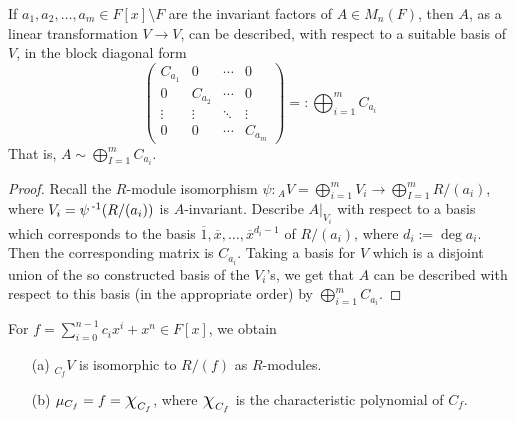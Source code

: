 \documentclass[11pt]{book}
\theoremstyle{definition}   \newtheorem{defn}[counter]{Definition} %
\newcommand{\ov}{\overline}   \newcommand{\wt}{\widetilde}
\newcommand{\bs}{\setminus}   \newcommand{\A}{\mathcal{A}}   \newcommand{\sy}{\textnormal{Syl}}   \newcommand{\size}[1]{\left| #1 \right|}
\newcommand{\mymatrix}[2]{\left( \begin{array}{#1} #2 \end{array} \right)}
\newcommand{\Chi}{\mbox{\Large $\chi$}}
\DeclareMathOperator{\ra}{\rightarrow}   \DeclareMathOperator{\Poly}{\mathbf{P}}   \DeclareMathOperator{\spn}{\textnormal{span}}   \DeclareMathOperator{\aut}{\textnormal{Aut}}
\newcommand{\vs}{\vspace{8pt}}
\numberwithin{counter}{chapter}
\begin{document}
\begin{corollary}
If $a_1,a_2,\dots,a_m \in F[x]\bs F$ are the invariant factors of $A \in M_n(F)$, then $A$, as a linear transformation $V \ra V$, can be described, with respect to a suitable basis of $V$, in the block diagonal form
	\[\mymatrix{cccc}{C_{a_1} & 0 & \cdots & 0 \\
	                  0 & C_{a_2} & \cdots & 0 \\
	                  \vdots & \vdots & \ddots & \vdots \\
	                  0 & 0 & \cdots & C_{a_m}} =: \bigoplus_{i=1}^m C_{a_i} \]
That is, $A \sim \bigoplus_{I=1}^m C_{a_i}$. 
\end{corollary}

\begin{proof}
Recall the $R$-module isomorphism $\psi : {_AV} = \bigoplus_{i=1}^m V_i \ra \bigoplus_{I=1}^m R/(a_i)$, where $V_i = \psi\operatorname{^{-1}}(R/(a_i))$ is $A$-invariant. Describe $A|_{V_i}$ with respect to a basis which corresponds to the basis $\ov{1},\ov{x},\dots,\ov{x}^{d_{i} - 1}$ of $R/(a_i)$, where $d_i := \deg a_i$. Then the corresponding matrix is $C_{a_i}$. Taking a basis for $V$ which is a disjoint union of the so constructed basis of the $V_i$'s, we get that $A$ can be described with respect to this basis (in the appropriate order) by $\bigoplus_{i=1}^m C_{a_i}$. 
\end{proof}

\vs

\begin{lemma}
For $f = \sum_{i=0}^{n-1} c_i x^i + x^n \in F[x]$, we obtain
\begin{enumerate}
\item[(a)] $_{C_f}V$ is isomorphic to $R/(f)$ as $R$-modules.
\item[(b)] $\mu_{C_f} = f = \Chi_{C_f}$, where $\Chi_{C_f}$ is the characteristic polynomial of $C_f$.
\end{enumerate}
\end{lemma}
\end{document}
